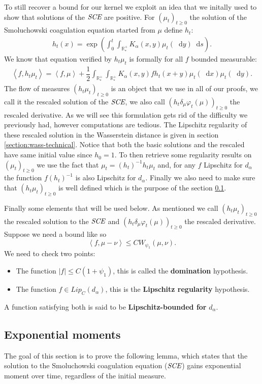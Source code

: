 \documentclass[11pt,a4paper]{article}
\newcommand{\RRP}{\mathbb{R}^+_*}
\newcommand{\SCE}{\emph{SCE}}
\newcommand{\Proc}[1]{\left(#1\right)_{t\geq 0}}
\newcommand{\brac}[1]{\left\langle#1\right\rangle}
\newcommand{\dd}{\mathop{}\!\mathrm{d}}
\begin{document}
To still recover a bound for our kernel we exploit an idea that we initally used to show that solutions of the $\SCE$ are positive. For $\Proc{\mu_t}$ the solution of the Smoluchowski coagulation equation  started from $\mu$ define $h_t$:
\begin{align*}
    h_t(x) = \exp\left(\int_0^t\int_{\RRP} K_\alpha(x,y) \mu_t(\dd y)\dd s\right).
\end{align*}
We know that equation verified by $h_t\mu_t$ is formally for all $f$ bounded measurable:
\begin{align*}
    \brac{f,h_t\mu_t} = \brac{f,\mu} + \dfrac{1}{2}\int_{\RRP} \int_{\RRP} K_\alpha(x,y) fh_t(x+y) \mu_t(\dd x) \mu_t (\dd y) .
\end{align*}
The flow of measures $\Proc{h_t\mu_t}$ is an object that we use in all of our proofs, we call it the rescaled solution of the $\SCE$, we also call $\Proc{h_t\delta_{\mu}\varphi_t(\mu)}$ the rescaled derivative. As we will see this formulation gets rid of the difficulty we previously had, however computations are tedious. The Lipschitz regularity of these rescaled solution in the Wasserstein distance is given in section \ref{section:wass-technical}. Notice that both the basic solutions and the rescaled have same initial value since $h_0 = 1$. To then retrieve some regularity results on $\Proc{\mu_t}$ we use the fact that $\mu_t = (h_t)^{-1}h_t \mu_t$ and, for any $f$ Lipschitz for $d_\alpha$ the function $f(h_t)^{-1}$ is also Lipschitz for $d_\alpha$. Finally we also need to make sure that $\Proc{h_t\mu_t}$ is well defined which is the purpose of the section \ref{section:wass-exponential}.

Finally some elements that will be used below. As mentioned we call $\Proc{h_t\mu_t}$ the rescaled solution to the $\SCE$ and $\Proc{h_t\delta_{\mu}\varphi_t(\mu)}$ the rescaled derivative. Suppose we need a bound like so
\[\brac{f,\mu-\nu} \leq C W_{\psi_1}(\mu,\nu).\]
We need to check two points:
\begin{itemize}
    \item The function $|f| \leq C(1 + \psi_1)$, this is called the \textbf{domination} hypothesis.
    \item The function $f \in Lip_C(d_\alpha)$, this is the \textbf{Lipschitz regularity} hypothesis.
\end{itemize}
A function satisfying both is said to be \textbf{Lipschitz-bounded for} $d_\alpha$.

\subsection{Exponential moments}\label{section:wass-exponential}
The goal of this section is to prove the following lemma, which states that the solution to the Smoluchowski coagulation equation ($\SCE$) gains exponential moment over time, regardless of the initial measure.
\end{document}
